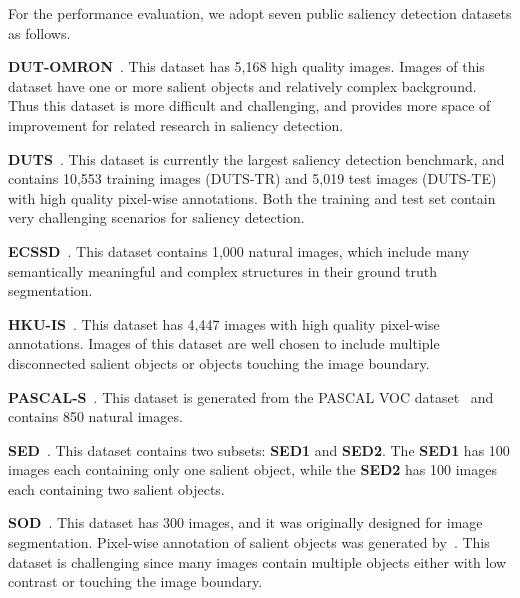 \documentclass[10pt,twocolumn,letterpaper]{article}
\begin{document}
For the performance evaluation, we adopt seven public saliency detection datasets as follows.

\textbf{DUT-OMRON}~\cite{yang2013saliency}. This dataset has 5,168 high quality images. Images of this dataset have one or more salient objects and relatively complex background. Thus this dataset is more difficult and challenging, and provides more space of improvement for related research in saliency detection.

\textbf{DUTS}~\cite{zhao2015saliency}. This dataset is currently the largest saliency detection benchmark, and contains 10,553 training images (DUTS-TR) and 5,019 test images (DUTS-TE) with high quality pixel-wise annotations.
Both the training and test set contain very challenging scenarios for saliency detection.

\textbf{ECSSD}~\cite{yan2013hierarchical}. This dataset contains 1,000 natural images, which include many semantically meaningful and complex structures in their ground truth segmentation.

\textbf{HKU-IS}~\cite{zhao2015saliency}. This dataset has 4,447 images with high quality pixel-wise annotations.
%
Images of this dataset are well chosen to include multiple disconnected salient objects or objects touching the image boundary.

\textbf{PASCAL-S}~\cite{li2014secrets}. This dataset is generated from the PASCAL VOC dataset~\cite{Everingham2010ThePV} and contains 850 natural images.

\textbf{SED}~\cite{borj2015salient}. This dataset contains two subsets: \textbf{SED1} and \textbf{SED2}.
%
The \textbf{SED1} has 100 images each containing only one salient object, while the \textbf{SED2} has 100 images each containing two salient objects.

\textbf{SOD}~\cite{yan2013hierarchical}. This dataset has 300 images, and it was originally designed for image segmentation.
%
Pixel-wise annotation of salient objects was generated by~\cite{jiang2013salient}.
%
This dataset is challenging since many images contain multiple objects either with low contrast or touching the image boundary.
\end{document}
